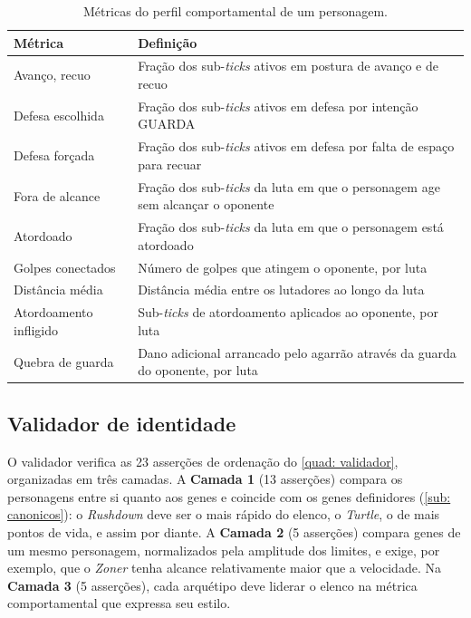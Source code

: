 \begin{table}[htb]
    \caption{Métricas do perfil comportamental de um personagem.}
    \label{tab: perfil}
    \centering
    \small
    \begin{tabularx}{\textwidth}{l X}
        \toprule
        \textbf{Métrica} & \textbf{Definição} \\
        \midrule
        Avanço, recuo & Fração dos sub-\textit{ticks} ativos em postura de avanço e de recuo \\
        Defesa escolhida & Fração dos sub-\textit{ticks} ativos em defesa por intenção GUARDA \\
        Defesa forçada & Fração dos sub-\textit{ticks} ativos em defesa por falta de espaço para recuar \\
        Fora de alcance & Fração dos sub-\textit{ticks} da luta em que o personagem age sem alcançar o oponente \\
        Atordoado & Fração dos sub-\textit{ticks} da luta em que o personagem está atordoado \\
        Golpes conectados & Número de golpes que atingem o oponente, por luta \\
        Distância média & Distância média entre os lutadores ao longo da luta \\
        Atordoamento infligido & Sub-\textit{ticks} de atordoamento aplicados ao oponente, por luta \\
        Quebra de guarda & Dano adicional arrancado pelo agarrão através da guarda do oponente, por luta \\
        \bottomrule
    \end{tabularx}
    \source
\end{table}

\subsection{Validador de identidade}
\label{sub: validador}

O validador verifica as 23 asserções de ordenação do \autoref{quad: validador}, organizadas em três camadas. A \textbf{Camada 1} (13 asserções) compara os personagens entre si quanto aos genes e coincide com os genes definidores (\autoref{sub: canonicos}): o \textit{Rushdown} deve ser o mais rápido do elenco, o \textit{Turtle}, o de mais pontos de vida, e assim por diante. A \textbf{Camada 2} (5 asserções) compara genes de um mesmo personagem, normalizados pela amplitude dos limites, e exige, por exemplo, que o \textit{Zoner} tenha alcance relativamente maior que a velocidade. Na \textbf{Camada 3} (5 asserções), cada arquétipo deve liderar o elenco na métrica comportamental que expressa seu estilo.

